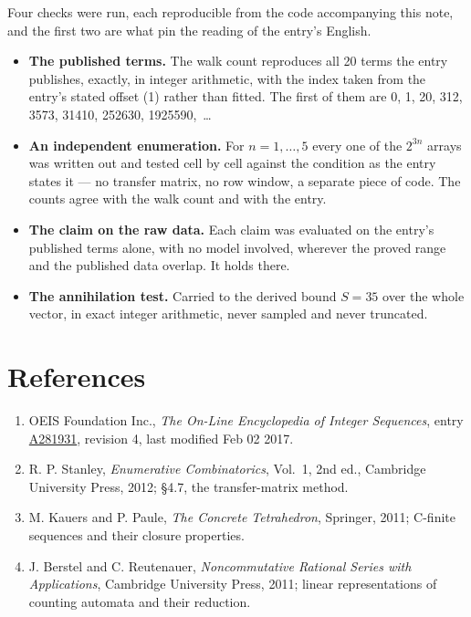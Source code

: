 \documentclass[11pt]{article}
\theoremstyle{definition}
\begin{document}
Four checks were run, each reproducible from the code accompanying this note, and the first two are what pin the reading of the entry's English.

\begin{itemize}

\item {\bfseries The published terms.} The walk count reproduces all 20 terms the entry publishes, exactly, in integer arithmetic, with the index taken from the entry's stated offset (1) rather than fitted. The first of them are 0, 1, 20, 312, 3573, 31410, 252630, 1925590,~\dots

\item {\bfseries An independent enumeration.} For $n = 1,\dots,5$ every one of the $2^{3n}$ arrays was written out and tested cell by cell against the condition as the entry states it --- no transfer matrix, no row window, a separate piece of code. The counts agree with the walk count and with the entry.

\item {\bfseries The claim on the raw data.} Each claim was evaluated on the entry's published terms alone, with no model involved, wherever the proved range and the published data overlap. It holds there.

\item {\bfseries The annihilation test.} Carried to the derived bound $S = 35$ over the whole vector, in exact integer arithmetic, never sampled and never truncated.

\end{itemize}

\section{References}

\begin{enumerate}

\item OEIS Foundation Inc., \emph{The On-Line Encyclopedia of Integer Sequences}, entry \href{https://oeis.org/A281931}{A281931}, revision 4, last modified Feb 02 2017.

\item R. P. Stanley, \emph{Enumerative Combinatorics}, Vol.~1, 2nd ed., Cambridge University Press, 2012; \S4.7, the transfer-matrix method.

\item M. Kauers and P. Paule, \emph{The Concrete Tetrahedron}, Springer, 2011; C-finite sequences and their closure properties.

\item J. Berstel and C. Reutenauer, \emph{Noncommutative Rational Series with Applications}, Cambridge University Press, 2011; linear representations of counting automata and their reduction.

\end{enumerate}
\end{document}

